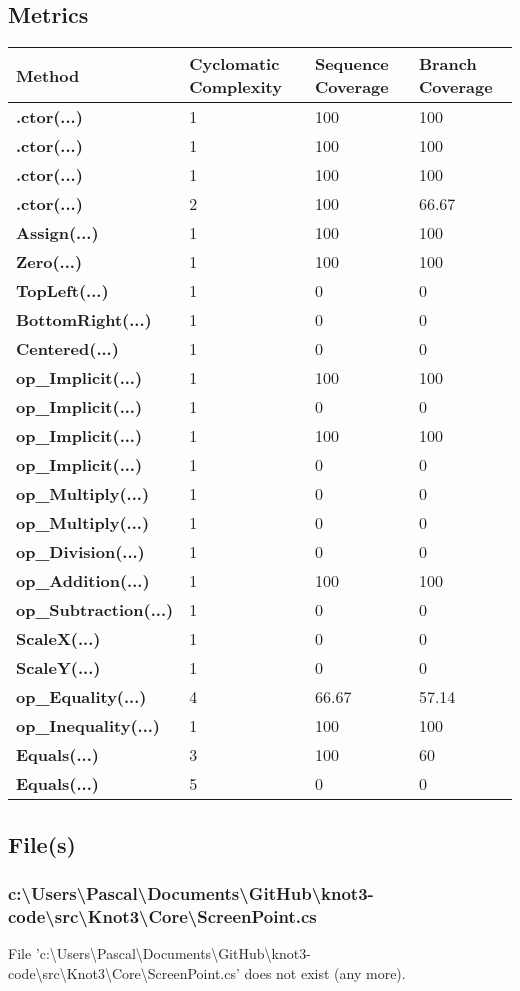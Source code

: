 \documentclass[a4paper,10pt]{article}
\begin{document}
\subsection{Metrics}
\begin{longtable}[l]{|l|l|l|l|}
\hline
\textbf{Method} & \textbf{Cyclomatic Complexity} & \textbf{Sequence Coverage} & \textbf{Branch Coverage}\\
\hline
\textbf{.ctor(...)} & 1 & 100 & 100\\
\hline
\textbf{.ctor(...)} & 1 & 100 & 100\\
\hline
\textbf{.ctor(...)} & 1 & 100 & 100\\
\hline
\textbf{.ctor(...)} & 2 & 100 & 66.67\\
\hline
\textbf{Assign(...)} & 1 & 100 & 100\\
\hline
\textbf{Zero(...)} & 1 & 100 & 100\\
\hline
\textbf{TopLeft(...)} & 1 & 0 & 0\\
\hline
\textbf{BottomRight(...)} & 1 & 0 & 0\\
\hline
\textbf{Centered(...)} & 1 & 0 & 0\\
\hline
\textbf{op\_Implicit(...)} & 1 & 100 & 100\\
\hline
\textbf{op\_Implicit(...)} & 1 & 0 & 0\\
\hline
\textbf{op\_Implicit(...)} & 1 & 100 & 100\\
\hline
\textbf{op\_Implicit(...)} & 1 & 0 & 0\\
\hline
\textbf{op\_Multiply(...)} & 1 & 0 & 0\\
\hline
\textbf{op\_Multiply(...)} & 1 & 0 & 0\\
\hline
\textbf{op\_Division(...)} & 1 & 0 & 0\\
\hline
\textbf{op\_Addition(...)} & 1 & 100 & 100\\
\hline
\textbf{op\_Subtraction(...)} & 1 & 0 & 0\\
\hline
\textbf{ScaleX(...)} & 1 & 0 & 0\\
\hline
\textbf{ScaleY(...)} & 1 & 0 & 0\\
\hline
\textbf{op\_Equality(...)} & 4 & 66.67 & 57.14\\
\hline
\textbf{op\_Inequality(...)} & 1 & 100 & 100\\
\hline
\textbf{Equals(...)} & 3 & 100 & 60\\
\hline
\textbf{Equals(...)} & 5 & 0 & 0\\
\hline
\end{longtable}
\subsection{File(s)}
\subsubsection{c:\textbackslash Users\textbackslash Pascal\textbackslash Documents\textbackslash GitHub\textbackslash knot3-code\textbackslash src\textbackslash Knot3\textbackslash Core\textbackslash ScreenPoint.cs}
 File 'c:\textbackslash Users\textbackslash Pascal\textbackslash Documents\textbackslash GitHub\textbackslash knot3-code\textbackslash src\textbackslash Knot3\textbackslash Core\textbackslash ScreenPoint.cs' does not exist (any more).
\end{document}

